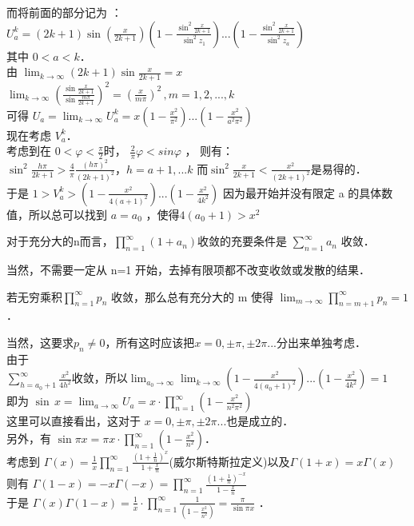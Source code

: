 而将前面的部分记为 ：$U^k_a=(2k+1)\sin(\frac x{2k+1})(1-\frac{\sin^2\frac x{2k+1}}{\sin^2z_1})...(1-\frac{\sin^2\frac x{2k+1}}{\sin^2z_{a}}) $\\
其中 $0<a<k $．\\
由  $\displaystyle \lim_{k\rightarrow\infty}(2k+1)\sin\frac{x}{2k+1}=x$\\
$\displaystyle \lim_{k\rightarrow\infty}\left( \frac{\sin\frac{x}{2k+1}}{\sin\frac{m\pi}{2k+1}} \right)^2=\left( \frac{x}{m\pi} \right)^2\,,m=1,2,...,k $\\
可得 $\displaystyle U_a=\lim_{k\rightarrow\infty}U^k_a=x(1-\frac{x^2}{\pi^2})...(1-\frac{x^2}{a^2\pi^2}) $\\
现在考虑 $V^k_a $．\\
考虑到在 $0<\varphi<\frac\pi2 $时， $\frac2\pi\varphi<sin\varphi$ ，
则有：$\sin^2\frac {h\pi}{2k+1}>\frac4\pi\frac{(h\pi)^2}{(2k+1)^2}，h=a+1,...k $
而$ \sin^2\frac x{2k+1}<\frac{x^2}{(2k+1)^2} $是易得的．\\
于是 $1>V^k_a>(1-\frac{x^2}{4(a+1)^2})...(1-\frac{x^2}{4k^2}) $
因为最开始并没有限定 a 的具体数值，所以总可以找到 $a=a_0$ ，使得$ 4(a_0+1)>x^2 $
\begin{lemma}{}
对于充分大的n而言，$\displaystyle  \prod_{n=1}^{∞}(1+a_n) $收敛的充要条件是  $\displaystyle  ∑_{n=1}^{∞}{a_n}$ 收敛．
\end{lemma}
当然，不需要一定从 n=1 开始，去掉有限项都不改变收敛或发散的结果．\\
\begin{lemma}{}
若无穷乘积$\displaystyle  \prod_{n=1}^{∞}p_n$ 收敛，那么总有充分大的 m 使得 $\displaystyle  \lim_{m\rightarrow∞}\prod_{n=m+1}^{∞}p_n=1 $．
\end{lemma}
当然，这要求$ p_n\ne0 $，所有这时应该把$ x=0,\pm\pi,\pm 2\pi... $分出来单独考虑．\\
由于 $\displaystyle \sum_{h=a_0+1}^{\infty}{\frac{x^2}{4h^2}} 收敛，所以 \lim_{a_0\rightarrow\infty}\lim_{k\rightarrow\infty}(1-\frac{x^2}{4(a_0+1)^2})...(1-\frac{x^2}{4k^2})=1 $\\
即为 $\displaystyle \sin\,x=\lim_{a\rightarrow\infty}U_a=x\cdot \prod_{n=1}^{\infty}(1-\frac{x^2}{n^2\pi^2}) $\\
这里可以直接看出，这对于 $x=0,\pm\pi,\pm 2\pi... $也是成立的．\\
另外，有 $\displaystyle \sin\pi x=\pi x\cdot \prod_{n=1}^{\infty}(1-\frac{x^2}{n^2}) $．\\
考虑到 $\displaystyle \Gamma(x)=\frac1x\prod_{n=1}^{\infty}\frac{(1+\frac1n)^{x}}{1+\frac xn} $(威尔斯特斯拉定义)以及$ \Gamma(1+x)=x\Gamma(x) $\\
则有 $\displaystyle  \Gamma(1-x)=-x\Gamma(-x)=\prod_{n=1}^{\infty}\frac{(1+\frac1n)^{-x}}{1-\frac xn} $\\
于是 $\displaystyle  \Gamma(x)\Gamma(1-x)=\frac{1}{x}\cdot \prod_{n=1}^{\infty}\frac1{(1-\frac{x^2}{n^2})}=\frac\pi{\sin\pi x}$ ．
